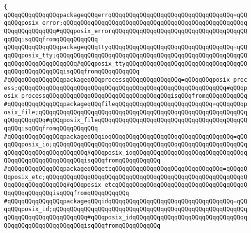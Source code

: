 \verb|{|\newline
\verb|qQQqqQQqqQQqqQQqpackageqQQqerrqQQqqQQqqQQqqQQqqQQqqQQqqQQqqQQqqQQq=qQQqqQQqposix_error;qQQqqQQqqQQqqQQqqQQqqQQqqQQqqQQqqQQqqQQqqQQqqQQqqQQqqQQqqQQqqQQqqQQq#qQQqposix_errorqQQqqQQqqQQqqQQqqQQqqQQqqQQqqQQqqQQqqQQqqQQqisqQQqfromqQQqqQQqqQQq|\newline
\verb|qQQqqQQqqQQqqQQqpackageqQQqttyqQQqqQQqqQQqqQQqqQQqqQQqqQQqqQQqqQQq=qQQqqQQqposix_tty;qQQqqQQqqQQqqQQqqQQqqQQqqQQqqQQqqQQqqQQqqQQqqQQqqQQqqQQqqQQqqQQqqQQqqQQqqQQq#qQQqposix_ttyqQQqqQQqqQQqqQQqqQQqqQQqqQQqqQQqqQQqqQQqqQQqqQQqqQQqisqQQqfromqQQqqQQqqQQq|\newline
\verb|#qQQqqQQqqQQqqQQqpackageqQQqprocessqQQqqQQqqQQqqQQq=qQQqqQQqposix_process;qQQqqQQqqQQqqQQqqQQqqQQqqQQqqQQqqQQqqQQqqQQqqQQqqQQqqQQqqQQq#qQQqposix_processqQQqqQQqqQQqqQQqqQQqqQQqqQQqqQQqqQQqisqQQqfromqQQqqQQqqQQq|\newline
\verb|#qQQqqQQqqQQqqQQqpackageqQQqfileqQQqqQQqqQQqqQQqqQQqqQQqqQQq=qQQqqQQqposix_file;qQQqqQQqqQQqqQQqqQQqqQQqqQQqqQQqqQQqqQQqqQQqqQQqqQQqqQQqqQQqqQQqqQQqqQQq#qQQqposix_fileqQQqqQQqqQQqqQQqqQQqqQQqqQQqqQQqqQQqqQQqqQQqqQQqisqQQqfromqQQqqQQqqQQq|\newline
\verb|#qQQqqQQqqQQqqQQqpackageqQQqioqQQqqQQqqQQqqQQqqQQqqQQqqQQqqQQqqQQq=qQQqqQQqposix_io;qQQqqQQqqQQqqQQqqQQqqQQqqQQqqQQqqQQqqQQqqQQqqQQqqQQqqQQqqQQqqQQqqQQqqQQqqQQqqQQq#qQQqposix_ioqQQqqQQqqQQqqQQqqQQqqQQqqQQqqQQqqQQqqQQqqQQqqQQqqQQqqQQqisqQQqfromqQQqqQQqqQQq|\newline
\verb|#qQQqqQQqqQQqqQQqpackageqQQqetcqQQqqQQqqQQqqQQqqQQqqQQqqQQqqQQq=qQQqqQQqposix_etc;qQQqqQQqqQQqqQQqqQQqqQQqqQQqqQQqqQQqqQQqqQQqqQQqqQQqqQQqqQQqqQQqqQQqqQQqqQQq#qQQqposix_etcqQQqqQQqqQQqqQQqqQQqqQQqqQQqqQQqqQQqqQQqqQQqqQQqqQQqisqQQqfromqQQqqQQqqQQq|\newline
\verb|#qQQqqQQqqQQqqQQqpackageqQQqidqQQqqQQqqQQqqQQqqQQqqQQqqQQqqQQqqQQq=qQQqqQQqposix_id;qQQqqQQqqQQqqQQqqQQqqQQqqQQqqQQqqQQqqQQqqQQqqQQqqQQqqQQqqQQqqQQqqQQqqQQqqQQqqQQq#qQQqposix_idqQQqqQQqqQQqqQQqqQQqqQQqqQQqqQQqqQQqqQQqqQQqqQQqqQQqqQQqisqQQqfromqQQqqQQqqQQq|\newline
